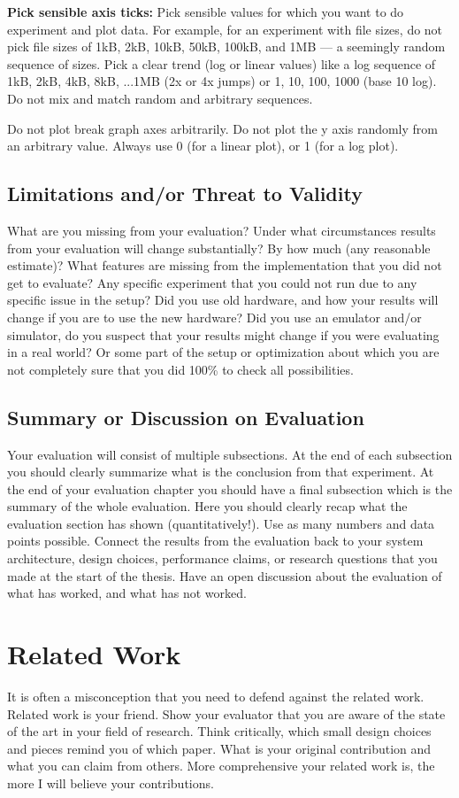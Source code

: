 \documentclass[11pt]{article}
\begin{document}
\textbf{Pick sensible axis ticks:} Pick sensible values for which you want to do experiment and plot data. For example, for an experiment with file sizes, do not pick file sizes of 1kB, 2kB, 10kB, 50kB, 100kB, and 1MB --- a seemingly random sequence of sizes. Pick a clear trend (log or linear values) like  a log sequence of 1kB, 2kB, 4kB, 8kB, ...1MB (2x or 4x jumps) or 1, 10, 100, 1000 (base 10 log). Do not mix and match random and arbitrary sequences. 

Do not plot break graph axes arbitrarily. Do not plot the y axis randomly from an arbitrary value. Always use 0 (for a linear plot), or 1 (for a log plot).  

\subsection{Limitations and/or Threat to Validity}
What are you missing from your evaluation? Under what circumstances results from your evaluation will change substantially? By how much (any reasonable estimate)? What features are missing from the implementation that you did not get to evaluate? Any specific experiment that you could not run due to any specific issue in the setup? Did you use old hardware, and how your results will change if you are to use the new hardware? Did you use an emulator and/or simulator, do you suspect that your results might change if you were evaluating in a real world? Or some part of the setup or optimization about which you are not completely sure that you did 100\% to check all possibilities. 

\subsection{Summary or Discussion on Evaluation}
Your evaluation will consist of multiple subsections. At the end of each subsection you should clearly summarize what is the conclusion from that experiment. At the end of your evaluation chapter you should have a final subsection which is the summary of the whole evaluation. Here you should clearly recap what the evaluation section has shown (quantitatively!). Use as many numbers and data points possible. Connect the results from the evaluation back to your system architecture, design choices, performance claims, or research questions that you made at the start of the thesis. Have an open discussion about the evaluation of what has worked, and what has not worked. 

\newpage 
\section{Related Work}
It is often a misconception that you need to defend against the related work. Related work is your friend. Show your evaluator that you are aware of the state of the art in your field of research. Think critically, which small design choices and pieces remind you of which paper. What is your original contribution and what you can claim from others. More comprehensive your related work is, the more I will believe your contributions. 
\end{document}
